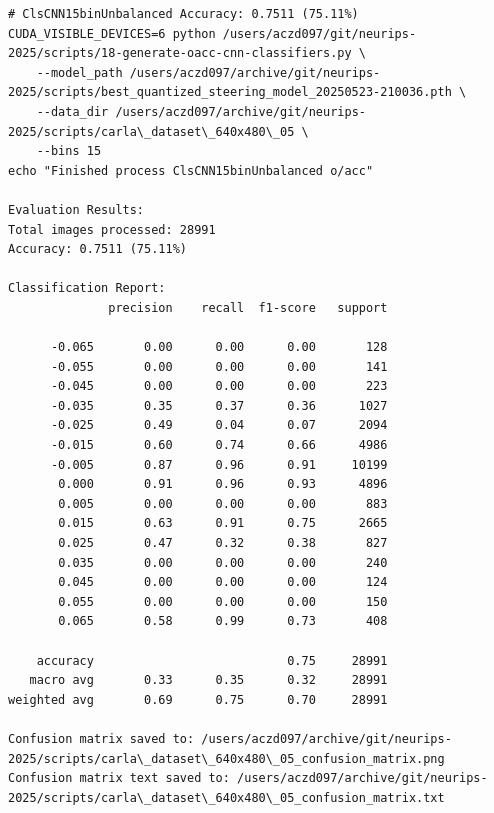 \begin{verbatim}
# ClsCNN15binUnbalanced Accuracy: 0.7511 (75.11%)
CUDA_VISIBLE_DEVICES=6 python /users/aczd097/git/neurips-2025/scripts/18-generate-oacc-cnn-classifiers.py \
    --model_path /users/aczd097/archive/git/neurips-2025/scripts/best_quantized_steering_model_20250523-210036.pth \
    --data_dir /users/aczd097/archive/git/neurips-2025/scripts/carla\_dataset\_640x480\_05 \
    --bins 15
echo "Finished process ClsCNN15binUnbalanced o/acc"

Evaluation Results:
Total images processed: 28991
Accuracy: 0.7511 (75.11%)

Classification Report:
              precision    recall  f1-score   support

      -0.065       0.00      0.00      0.00       128
      -0.055       0.00      0.00      0.00       141
      -0.045       0.00      0.00      0.00       223
      -0.035       0.35      0.37      0.36      1027
      -0.025       0.49      0.04      0.07      2094
      -0.015       0.60      0.74      0.66      4986
      -0.005       0.87      0.96      0.91     10199
       0.000       0.91      0.96      0.93      4896
       0.005       0.00      0.00      0.00       883
       0.015       0.63      0.91      0.75      2665
       0.025       0.47      0.32      0.38       827
       0.035       0.00      0.00      0.00       240
       0.045       0.00      0.00      0.00       124
       0.055       0.00      0.00      0.00       150
       0.065       0.58      0.99      0.73       408

    accuracy                           0.75     28991
   macro avg       0.33      0.35      0.32     28991
weighted avg       0.69      0.75      0.70     28991

Confusion matrix saved to: /users/aczd097/archive/git/neurips-2025/scripts/carla\_dataset\_640x480\_05_confusion_matrix.png
Confusion matrix text saved to: /users/aczd097/archive/git/neurips-2025/scripts/carla\_dataset\_640x480\_05_confusion_matrix.txt


\end{verbatim}
